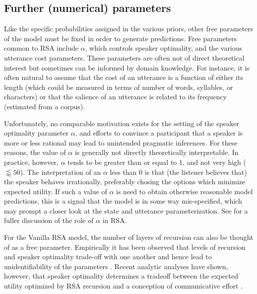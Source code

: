 \documentclass{sp}
\newcommand{\mht}[1]{\textcolor{purple}{[mht: #1]}}
\begin{document}

%


\subsection{Further (numerical) parameters}

Like the specific probabilities assigned in the various priors, other free parameters of the model must be fixed in order to generate predictions. Free parameters common to RSA include $\alpha$, which controls speaker optimality, and the various utterance cost parameters. These parameters are often not of direct theoretical interest but sometimes can be informed by domain knowledge. For instance, it is often natural to assume that the cost of an utterance is a function of either its length  (which could be measured in terms of number of words, syllables, or characters) or that the salience of an utterance is related to its frequency (estimated from a corpus).

Unfortunately,  no comparable motivation exists for the setting of the speaker optimality parameter $\alpha$, and efforts to convince a participant that a speaker is more or less rational may lead to unintended pragmatic inferences. For these reasons, the value of $\alpha$ is generally not directly theoretically interpretable. In practice, however, $\alpha$ tends to be greater than or equal to 1, and not very high ($\lessapprox 50$). The interpretation of an $\alpha$ less than 0 is that (the listener believes that) the speaker behaves irrationally, preferably chosing the options which minimize expected utility. If such a value of $\alpha$ is need to obtain otherwise reasonable model predictions, this is a signal that the model is in some way mis-specified, which may prompt a closer look at the state and utterance parameterization.  See \cite{zaslavsky2020rate} for a fuller discussion of the role of $\alpha$ in RSA.

For the Vanilla RSA model, the number of layers of recursion can also be thought of as a free parameter. Empirically it has been observed that levels of recursion and speaker optimality trade-off with one another  and hence lead to unidentifiability of the parameters \citep{frank2016rational}. Recent analytic analyses have shown, however, that speaker optimality determines a tradeoff between the expected utility optimized by RSA recursion and a conception of communicative effort \citep{zaslavsky2020rate}.
\end{document}
